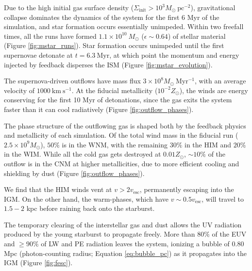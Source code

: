 \documentclass[twocolumn,linenumbers]{aastex631}
\begin{document}
Due to the high initial gas surface density ($\Sigma_\mathrm{init} > 10^3 M_\odot \ \mathrm{pc^{-2}}$), gravitational collapse dominates the dynamics of the system for the first 6 Myr of the simulation, and star formation occurs essentially unimpeded. Within two freefall times, all the runs have formed $1.1\times 10^{10}\ M_\odot$ ($\epsilon \sim 0.64$) of stellar material (Figure \ref{fig:mstar_runs}). Star formation occurs unimpeded until the first supernovae detonate at $t = 6.3\ \mathrm{Myr}$, at which point the momentum and energy injected by feedback disperses the ISM (Figure \ref{fig:mstar_evolution}). 

The supernova-driven outflows have mass flux $3\times 10^8 M_\odot\ \mathrm{Myr^{-1}}$, with an average velocity of $1000\ \mathrm{km\ s^{-1}}$. At the fiducial metallicity ($10^{-2} Z_\odot$), the winds are energy conserving for the first 10 Myr of detonations, since the gas exits the system faster than it can cool radiatively (Figure \ref{fig:outflow_phases}).

The phase structure of the outflowing gas is shaped both by the feedback physics and metallicity of each simulation. Of the total wind mass in the fiducial run ($2.5\times 10^9 M_\odot$), $50\%$ is in the WNM, with the remaining $30\%$ in the HIM and $20\%$ in the WIM. While all the cold gas gets destroyed at $0.01 Z_\odot$, $\sim 10\%$ of the outflow is in the CNM at higher metallicities, due to more efficient cooling and shielding by dust (Figure \ref{fig:outflow_phases}).

We find that the HIM winds vent at $v > 2 v_\mathrm{esc}$, permanently escaping into the IGM. On the other hand, the warm-phases, which have $v \sim 0.5 v_\mathrm{esc}$, will travel to $1.5-2$ kpc before raining back onto the starburst. 

The temporary clearing of the interstellar gas and dust allows the UV radiation produced by the young starburst to propagate freely. More than $80\%$ of the EUV and $\geq 90\%$ of LW and PE radiation leaves the system, ionizing a bubble of $0.80$ Mpc (photon-counting radius; Equation \ref{eq:bubble_pc}) as it propagates into the IGM (Figure \ref{fig:fesc}).


          
{}

\end{document}
